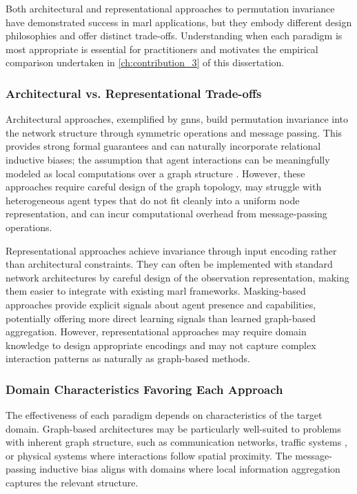 Both architectural and representational approaches to permutation
invariance have demonstrated success in \gls{marl} applications,
but they embody different design philosophies and offer distinct
trade-offs. Understanding when each paradigm is most appropriate
is essential for practitioners and motivates the empirical
comparison undertaken in \cref{ch:contribution_3} of this dissertation.

\subsubsection{Architectural vs. Representational Trade-offs}

Architectural approaches, exemplified by \glspl{gnn}, build
permutation invariance into the network structure through
symmetric operations and message passing. This provides strong
formal guarantees and can naturally incorporate relational
inductive biases; the assumption that agent interactions can be
meaningfully modeled as local computations over a graph structure
\cite{zambaldi2018}. However, these approaches require careful
design of the graph topology, may struggle with heterogeneous
agent types that do not fit cleanly into a uniform node
representation, and can incur computational overhead from
message-passing operations.

Representational approaches achieve invariance through input
encoding rather than architectural constraints. They can often
be implemented with standard network architectures by careful
design of the observation representation, making them easier to
integrate with existing \gls{marl} frameworks. Masking-based
approaches provide explicit signals about agent presence and
capabilities, potentially offering more direct learning signals
than learned graph-based aggregation. However, representational
approaches may require domain knowledge to design appropriate
encodings and may not capture complex interaction patterns as
naturally as graph-based methods.

\subsubsection{Domain Characteristics Favoring Each Approach}

The effectiveness of each paradigm depends on characteristics
of the target domain. Graph-based architectures may be
particularly well-suited to problems with inherent graph
structure, such as communication networks, traffic systems
\cite{yang2021a}, or physical systems where interactions
follow spatial proximity. The message-passing inductive bias
aligns with domains where local information aggregation captures
the relevant structure.

